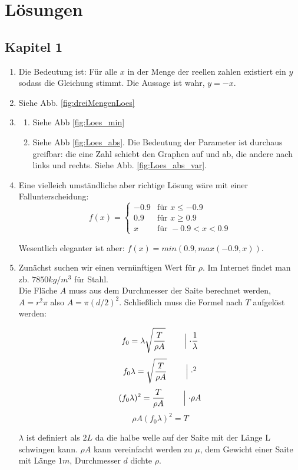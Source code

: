 \chapter{Lösungen}

\section{Kapitel 1}
\begin{enumerate}
	\item Die Bedeutung ist: Für alle $x$ in der Menge der reellen zahlen existiert ein $y$ sodass die Gleichung stimmt. Die Aussage ist wahr, $y = -x$.
    \item Siehe Abb. \ref{fig:dreiMengenLoes}
    \item 
    \begin{enumerate}
\item Siehe Abb \ref{fig:Loes_min}
\item Siehe Abb \ref{fig:Loes_abs}. Die Bedeutung der Parameter ist durchaus greifbar: die eine Zahl schiebt den Graphen auf und ab, die andere nach links und rechts. Siehe Abb. \ref{fig:Loes_abs_var}.
    \end{enumerate}

\item Eine vielleich umständliche aber richtige Lösung wäre mit einer Fallunterscheidung:
$$ f(x) = \begin{cases} 
-0.9 & \text{für } x \leq -0.9 \\ 
0.9 & \text{für } x \geq 0.9 \\
x & \text{für }  -0.9 < x < 0.9
\end{cases}$$

Wesentlich eleganter ist aber: $f(x) = min(0.9, max(-0.9, x))$.

\item Zunächst suchen wir einen vernünftigen Wert für $\rho$. Im Internet findet man zb. $7850 kg/m^3$ für Stahl. \\
Die Fläche $A$ muss aus dem Durchmesser der Saite berechnet werden, $A = r^2 \pi$ also $A = \pi (d/2)^2$.  
Schließlich muss die Formel nach $T$ aufgelöst werden:

$$ f_0 = \lambda \sqrt{\frac{T}{\rho A}} \qquad  \Bigm\lvert \cdot \frac{1}{\lambda}$$ 
$$ f_0 \lambda =  \sqrt{\frac{T}{\rho A}} \qquad \Bigm\lvert  \cdot ^2$$
$$ (f_0 \lambda)^2 =  \frac{T}{\rho A} \qquad \Bigm\lvert \cdot \rho A$$
$$ \rho A (f_0 \lambda)^2 =  T $$ 

$\lambda$ ist definiert als $2L$ da die halbe welle auf der Saite mit der Länge L schwingen kann. $\rho A$ kann vereinfacht werden zu $\mu$, dem Gewicht einer Saite mit Länge $1m$, Durchmesser $d$ dichte $\rho$.


\end{enumerate}
